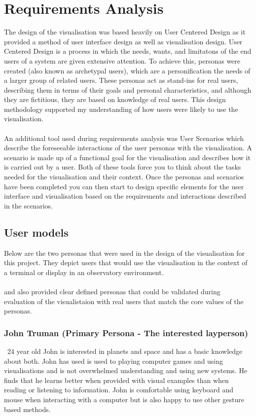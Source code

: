 \chapter{Requirements Analysis}\label{C:ra}
The design of the visualisation was based heavily on User Centered Design as it provided a method of user interface design as well as visualisation design. User Centered Design is a process in which the needs, wants, and limitatons of the end users of a system are given extensive attention. To achieve this, personas were created (also known as archetypal users), which are a personification the needs of a larger group of related users. These personas act as stand-ins for real users, describing them in terms of their goals and personal characteristics, and although they are fictitious, they are based on knowledge of real users. This design methodology supported my understanding of how users were likely to use the visualisation.
\\\\
An additional tool used during requirements analysis was User Scenarios which describe the foreseeable interactions of the user personas with the visualisation. A scenario is made up of a functional goal for the visualisation and describes how it is carried out by a user. Both of these tools force you to think about the tasks needed for the visualisation and their context. Once the personas and scenarios have been completed you can then start to design specific elements for the user interface and visualisation based on the requirements and interactions described in the scenarios.
\section{User models}
Below are the two personas that were used in the design of the visualisation for this project. They depict users that would use the visualisation in the context of a terminal or display in an observatory environment. 
\\\\
 and also provided clear defined personas that could be validated during evaluation of the visualistaion with real users that match the core values of the personas.
\subsection{John Truman (Primary Persona -  The interested layperson)}\
24 year old John is interested in planets and space and has a basic knowledge about both. John has used is used to playing computer games and using visualisations and is not overwhelmed understanding and using new systems. He finds that he learns better when provided with visual examples than when reading or listening to information. John is comfortable using keyboard and mouse when interacting with a computer but is also happy to use other gesture based methods. 
